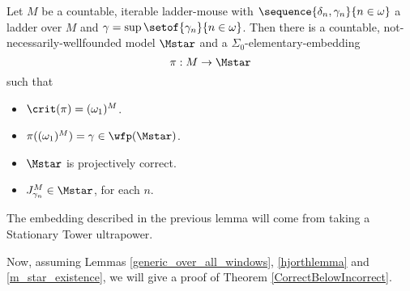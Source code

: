 \documentclass[oneside,12pt]{amsart}
\begin{document}
\begin{lemma}
\label{m_star_existence}
Let $M$ be a countable, iterable ladder-mouse
with $\sequence{\delta_n,\gamma_n}{n\in\omega}$ a ladder over $M$ and
$\gamma=\sup\setof{\gamma_n}{n\in\omega}$. Then there is a countable,
not-necessarily-wellfounded model $\Mstar$ and a $\Sigma_0$-elementary-embedding
$$\pi:M\to\Mstar$$
such that
\begin{itemize}
\item $\crit(\pi) = (\omega_1)^M$.
\item $\pi((\omega_1)^M) = \gamma \in \wfp(\Mstar)$.
\item $\Mstar$ is projectively correct.
\item $J^{M}_{\gamma_n}\in\Mstar$, for each $n$.
\end{itemize}
\end{lemma}

The embedding described in the previous lemma will come from taking a Stationary Tower
ultrapower.

Now, assuming Lemmas \ref{generic_over_all_windows}, \ref{hjorthlemma} and
\ref{m_star_existence}, we will give a proof of Theorem \ref{CorrectBelowIncorrect}.
\end{document}
